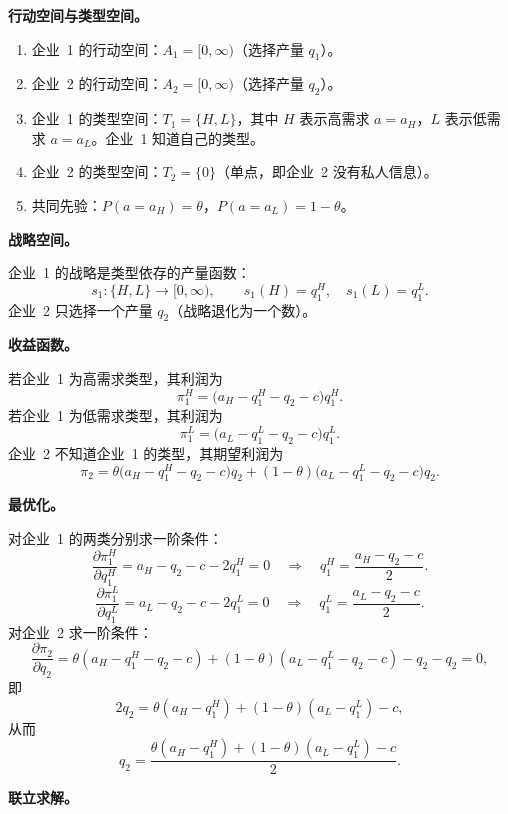 \sol

\textbf{行动空间与类型空间。}
\begin{enumerate}[nosep]
\item 企业~1 的行动空间：$A_1=[0,\infty)$（选择产量 $q_1$）。
\item 企业~2 的行动空间：$A_2=[0,\infty)$（选择产量 $q_2$）。
\item 企业~1 的类型空间：$T_1=\{H,L\}$，其中 $H$ 表示高需求 $a=a_H$，$L$ 表示低需求 $a=a_L$。企业~1 知道自己的类型。
\item 企业~2 的类型空间：$T_2=\{0\}$（单点，即企业~2 没有私人信息）。
\item 共同先验：$P(a=a_H)=\theta$，$P(a=a_L)=1-\theta$。
\end{enumerate}

\textbf{战略空间。}

企业~1 的战略是类型依存的产量函数：
\[
	s_1:\{H,L\}\to[0,\infty),\qquad s_1(H)=q_1^H,\quad s_1(L)=q_1^L.
\]\indent
企业~2 只选择一个产量 $q_2$（战略退化为一个数）。

\textbf{收益函数。}

若企业~1 为高需求类型，其利润为
\[
	\pi_1^H=\bigl(a_H-q_1^H-q_2-c\bigr)q_1^H.
\]\indent
若企业~1 为低需求类型，其利润为
\[
	\pi_1^L=\bigl(a_L-q_1^L-q_2-c\bigr)q_1^L.
\]\indent
企业~2 不知道企业~1 的类型，其期望利润为
\[
	\pi_2=\theta\bigl(a_H-q_1^H-q_2-c\bigr)q_2+(1-\theta)\bigl(a_L-q_1^L-q_2-c\bigr)q_2.
\]

\textbf{最优化。}

对企业~1 的两类分别求一阶条件：
\[
	\frac{\partial\pi_1^H}{\partial q_1^H}=a_H-q_2-c-2q_1^H=0
	\quad\Longrightarrow\quad
	q_1^H=\frac{a_H-q_2-c}{2}.
\]\indent
\[
	\frac{\partial\pi_1^L}{\partial q_1^L}=a_L-q_2-c-2q_1^L=0
	\quad\Longrightarrow\quad
	q_1^L=\frac{a_L-q_2-c}{2}.
\]\indent
对企业~2 求一阶条件：
\[
	\frac{\partial\pi_2}{\partial q_2}
	=\theta(a_H-q_1^H-q_2-c)+(1-\theta)(a_L-q_1^L-q_2-c)-q_2-q_2=0,
\]\indent
即
\[
	2q_2=\theta(a_H-q_1^H)+(1-\theta)(a_L-q_1^L)-c,
\]\indent
从而
\[
	q_2=\frac{\theta(a_H-q_1^H)+(1-\theta)(a_L-q_1^L)-c}{2}.
\]

\textbf{联立求解。}

